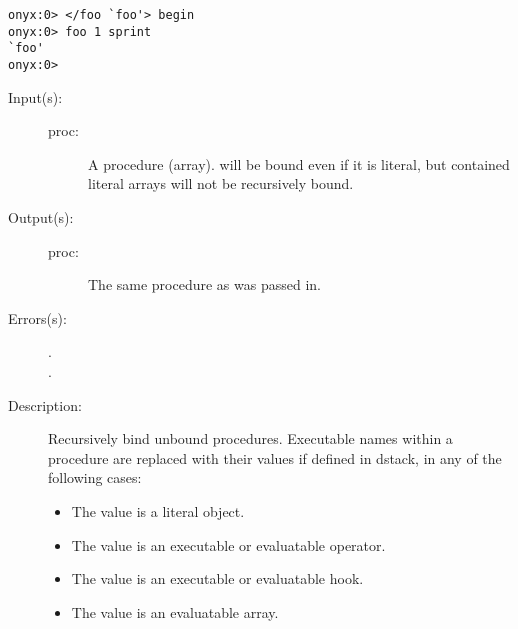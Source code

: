 \begin{description}
\begin{description}
\begin{verbatim}
onyx:0> </foo `foo'> begin
onyx:0> foo 1 sprint
`foo'
onyx:0>
		\end{verbatim}
	\end{description}
\label{systemdict:bind}
\item[{\onyxop{proc}{bind}{proc}}: ]
	\begin{description}\item[]
	\item[Input(s): ]
		\begin{description}\item[]
		\item[proc: ]
			A procedure (array).   will be bound even if
			it is literal, but contained literal arrays will not be
			recursively bound.
		\end{description}
	\item[Output(s): ]
		\begin{description}\item[]
		\item[proc: ]
			The same procedure as was passed in.
		\end{description}
	\item[Errors(s): ]
		\begin{description}\item[]
		\item[.]
		\item[.]
		\end{description}
	\item[Description: ]
		Recursively bind unbound procedures.  Executable names within a
		procedure are replaced with their values if defined in dstack,
		in any of the following cases:
		\begin{itemize}
		\item{The value is a literal object.}
		\item{The value is an executable or evaluatable operator.}
		\item{The value is an executable or evaluatable hook.}
		\item{The value is an evaluatable array.}
		\end{itemize}


\end{description}
\end{description}
